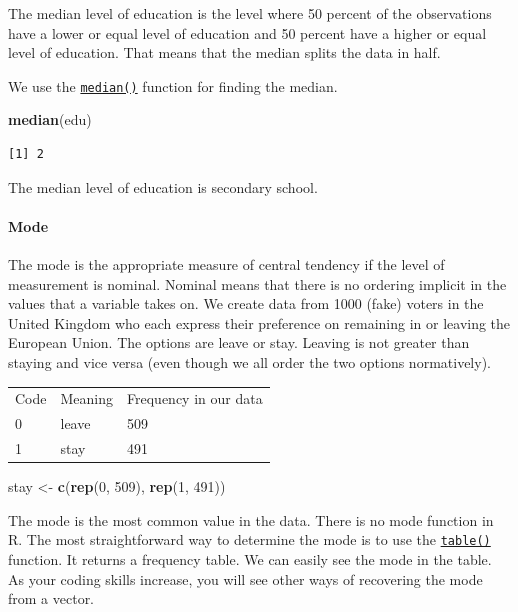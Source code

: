 \documentclass[]{article}
\newenvironment{Shaded}{\begin{snugshade}}{\end{snugshade}}
\newcommand{\KeywordTok}[1]{\textcolor[rgb]{0.13,0.29,0.53}{\textbf{#1}}}
\newcommand{\DecValTok}[1]{\textcolor[rgb]{0.00,0.00,0.81}{#1}}
\newcommand{\StringTok}[1]{\textcolor[rgb]{0.31,0.60,0.02}{#1}}
\newcommand{\NormalTok}[1]{#1}
\let\oldparagraph\paragraph
\renewcommand{\paragraph}[1]{\oldparagraph{#1}\mbox{}}
\theoremstyle{definition}
\theoremstyle{definition}
\theoremstyle{definition}
\theoremstyle{remark}
\begin{document}
The median level of education is the level where 50 percent of the
observations have a lower or equal level of education and 50 percent
have a higher or equal level of education. That means that the median
splits the data in half.

We use the \href{http://bit.ly/R_median}{\texttt{median()}} function for
finding the median.

\begin{Shaded}
\begin{Highlighting}[]
\KeywordTok{median}\NormalTok{(edu)}
\end{Highlighting}
\end{Shaded}

\begin{verbatim}
[1] 2
\end{verbatim}

The median level of education is secondary school.

\paragraph{Mode}\label{mode}

The mode is the appropriate measure of central tendency if the level of
measurement is nominal. Nominal means that there is no ordering implicit
in the values that a variable takes on. We create data from 1000 (fake)
voters in the United Kingdom who each express their preference on
remaining in or leaving the European Union. The options are leave or
stay. Leaving is not greater than staying and vice versa (even though we
all order the two options normatively).

\begin{longtable}[]{@{}lll@{}}
\toprule
Code & Meaning & Frequency in our data\tabularnewline
0 & leave & 509\tabularnewline
1 & stay & 491\tabularnewline
\bottomrule
\end{longtable}

\begin{Shaded}
\begin{Highlighting}[]
\NormalTok{stay <-}\StringTok{ }\KeywordTok{c}\NormalTok{(}\KeywordTok{rep}\NormalTok{(}\DecValTok{0}\NormalTok{, }\DecValTok{509}\NormalTok{), }\KeywordTok{rep}\NormalTok{(}\DecValTok{1}\NormalTok{, }\DecValTok{491}\NormalTok{))}
\end{Highlighting}
\end{Shaded}

The mode is the most common value in the data. There is no mode function
in R. The most straightforward way to determine the mode is to use the
\href{http://bit.ly/R_table}{\texttt{table()}} function. It returns a
frequency table. We can easily see the mode in the table. As your coding
skills increase, you will see other ways of recovering the mode from a
vector.
\end{document}
